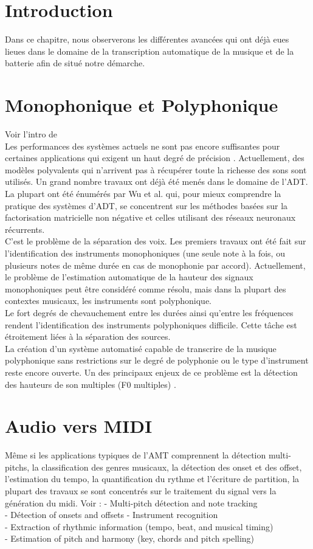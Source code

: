 \section*{Introduction}
Dans ce chapitre, nous observerons les différentes avancées qui ont déjà eues lieues dans le domaine de la transcription automatique de la musique et de la batterie afin de situé notre démarche. 
  
\section{Monophonique et Polyphonique}
Voir l’intro de \cite{article1}\\
Les performances des systèmes actuels ne sont pas encore suffisantes pour certaines applications qui exigent un haut degré de précision \cite{article1}.
Actuellement, des modèles polyvalents qui n’arrivent pas à récupérer toute la richesse des sons sont utilisés.
Un grand nombre travaux ont déjà été menés dans le domaine de l’ADT. La plupart ont été énumérés par Wu et al. \cite{8350302} qui, pour mieux comprendre la pratique des systèmes d’ADT, se concentrent sur les méthodes basées sur la factorisation matricielle non négative et celles utilisant des réseaux neuronaux récurrents.\\
C’est le problème de la séparation des voix.
Les premiers travaux ont été fait sur l’identification des instruments monophoniques (une seule note à la fois, ou plusieurs notes de même durée en cas de monophonie par accord). Actuellement, le problème de l'estimation automatique de la hauteur des signaux monophoniques peut être considéré comme résolu, mais dans la plupart des contextes musicaux, les instruments sont polyphonique.\\
Le fort degrés de chevauchement entre les durées ainsi qu’entre les fréquences rendent l’identification des instruments polyphoniques difficile. Cette tâche est étroitement liées à la séparation des sources.\\
La création d'un système automatisé capable de transcrire de la musique polyphonique sans restrictions sur le degré de polyphonie ou le type d'instrument reste encore ouverte. Un des principaux enjeux de ce problème est la détection des hauteurs de son multiples (F0 multiples) \cite{article1}.
\section{Audio vers MIDI}
Même si les applications typiques de l'AMT comprennent la détection multi-pitchs, la classification des genres musicaux, la détection des onset et des offset, l'estimation du tempo, la quantification du rythme et l’écriture de partition, la plupart des travaux se sont concentrés sur le traitement du signal vers la génération du midi\cite{article2}.
Voir : \cite{article1}
- Multi-pitch détection and note tracking\\
- Détection of onsets and offsets
- Instrument recognition\\
- Extraction of rhythmic information (tempo, beat, and musical timing)\\
- Estimation of pitch and harmony (key, chords and pitch spelling)
